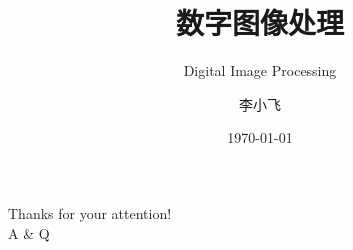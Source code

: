 \documentclass[12pt,UTF8,aspectratio=169]{beamer}
\begin{document}

\author{李小飞}
\title{数字图像处理}
\subtitle{Digital Image Processing}
\date{\today}

\begin{frame} [plain]
     {} %
    \Background[19] 
    \maketitle %
    \addtocounter{framenumber}{-1} 
\end{frame}

% 
%
  
%     
%    
% 
%  
% 
%   
%
%    


\begin{frame}[plain]
    \Background[2] 
	\begin{center}
		{\huge \color{deepred} \textrm{Thanks for your attention!  \\ \vspace{1.0em}
         A \& Q}}
	\end{center}
    \addtocounter{framenumber}{-1} 
\end{frame}

\end{document}

